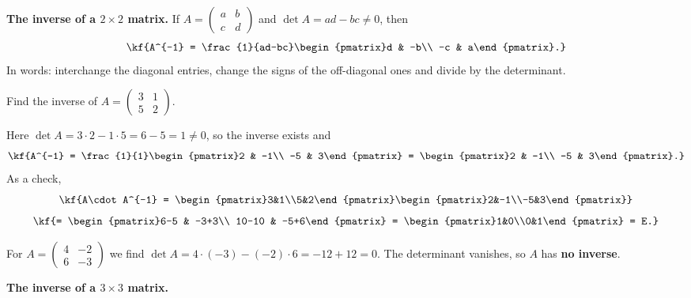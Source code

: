 \textbf{The inverse of a $2\times 2$ matrix.}
If $A=\begin{pmatrix}a&b\\c&d\end{pmatrix}$ and $\det A = ad-bc\neq 0$, then
\[\kf{A^{-1} = \frac{1}{ad-bc}\begin{pmatrix}d & -b\\ -c & a\end{pmatrix}.}\]
In words: interchange the diagonal entries, change the signs of the
off-diagonal ones and divide by the determinant.
\begin{misol}
Find the inverse of $A=\begin{pmatrix}3 & 1\\ 5 & 2\end{pmatrix}$.
\begin{yechish}
Here $\det A = 3\cdot 2 - 1\cdot 5 = 6-5 = 1 \neq 0$, so the inverse exists and
\[\kf{A^{-1} = \frac{1}{1}\begin{pmatrix}2 & -1\\ -5 & 3\end{pmatrix}
= \begin{pmatrix}2 & -1\\ -5 & 3\end{pmatrix}.}\]
As a check,
\[\kf{A\cdot A^{-1} = \begin{pmatrix}3&1\\5&2\end{pmatrix}\begin{pmatrix}2&-1\\-5&3\end{pmatrix}}\]
\[\kf{= \begin{pmatrix}6-5 & -3+3\\ 10-10 & -5+6\end{pmatrix}
= \begin{pmatrix}1&0\\0&1\end{pmatrix} = E.}\]
\end{yechish}
\end{misol}
\begin{misol}
For $A=\begin{pmatrix}4 & -2\\ 6 & -3\end{pmatrix}$ we find
$\det A = 4\cdot(-3) - (-2)\cdot 6 = -12+12 = 0$. The determinant vanishes,
so $A$ has \textbf{no inverse}.
\end{misol}
\textbf{The inverse of a $3\times 3$ matrix.}
\vspace{3pt}
